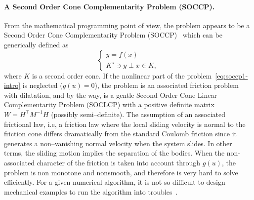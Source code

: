 

\paragraph{A Second Order Cone Complementarity Problem (SOCCP).}
From the mathematical programming point of view, the problem appears to be a Second Order Cone Complementarity Problem (SOCCP)~\cite{Facchinei.Pang2003} which can be generically defined as
\begin{equation}
  \begin{cases}
    y =f(x) \\
    K^\star \ni y \perp x \in K,
  \end{cases}
\end{equation}
where $K$ is a second order cone. If the nonlinear part of the problem~\eqref{eq:soccp1-intro} is neglected ($g(u)=0$), the problem is an associated friction problem with dilatation, and by the way, is a gentle Second Order Cone Linear Complementarity Problem (SOCLCP) with a positive definite matrix $W = H^\top M^{-1} H$ (possibly semi--definite). {The assumption of an associated frictional law, i.e, a friction law where the local sliding velocity is normal to the friction cone differs dramatically from the standard Coulomb friction since it generates a non--vanishing normal velocity when the system slides. In other terms, the sliding motion implies the separation of the bodies.}
When the non-associated character of the friction is taken into account through $g(u)$, the problem is non monotone and nonsmooth, and therefore is very hard to solve efficiently. For a given numerical algorithm, it is not so difficult to design mechanical examples to run the algorithm into troubles~\cite{Cadoux2009}.

